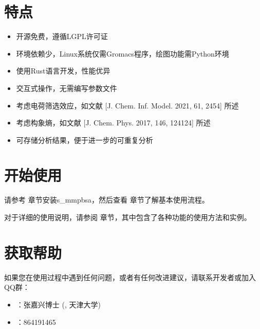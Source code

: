 \documentclass[letterpaper,10pt,english]{sphinxmanual}
\begin{document}
\chapter{特点}
\label{\detokenize{index:id3}}\begin{itemize}
\item {} 
\sphinxAtStartPar
开源免费，遵循LGPL许可证

\item {} 
\sphinxAtStartPar
环境依赖少，Linux系统仅需Gromacs程序，绘图功能需Python环境

\item {} 
\sphinxAtStartPar
使用Rust语言开发，性能优异

\item {} 
\sphinxAtStartPar
交互式操作，无需编写参数文件

\item {} 
\sphinxAtStartPar
考虑电荷筛选效应，如文献 {[}J. Chem. Inf. Model. 2021, 61, 2454{]} 所述

\item {} 
\sphinxAtStartPar
考虑构象熵，如文献 {[}J. Chem. Phys. 2017, 146, 124124{]} 所述

\item {} 
\sphinxAtStartPar
可存储分析结果，便于进一步的可重复分析

\end{itemize}


\chapter{开始使用}
\label{\detokenize{index:id4}}
\sphinxAtStartPar
请参考 {\hyperref[\detokenize{installation::doc}]{}} 章节安装s\_mmpbsa，然后查看 {\hyperref[\detokenize{quick_start::doc}]{}} 章节了解基本使用流程。

\sphinxAtStartPar
对于详细的使用说明，请参阅 {\hyperref[\detokenize{usage::doc}]{}} 章节，其中包含了各种功能的使用方法和实例。


\chapter{获取帮助}
\label{\detokenize{index:id5}}
\sphinxAtStartPar
如果您在使用过程中遇到任何问题，或者有任何改进建议，请联系开发者或加入QQ群：
\begin{itemize}
\item {} 
\sphinxAtStartPar
{}：张嘉兴博士 (, 天津大学)

\item {} 
\sphinxAtStartPar
{}：864191465

\end{itemize}
\end{document}
